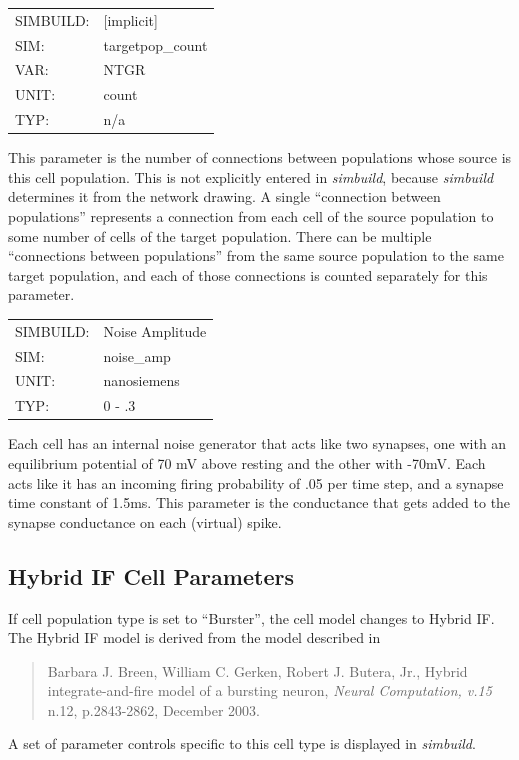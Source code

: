 \documentclass[12pt,openany,oneside]{book}
\newcommand{\ticite}[1]{\textit{#1}}
\newcommand{\prog}[1]{\textit{{#1}}}
\newcommand{\inquotes}[1]{{{``#1''}}}
\begin{document}
\begin{flushleft}
\begin{tabular}{@{}ll@{}}
SIMBUILD: & [implicit]\\
SIM: & targetpop\_count\\
VAR: & NTGR\\
UNIT: & count\\
TYP: & n/a\\
\end{tabular}
\end{flushleft}
\noindent
This parameter is the number of connections between populations whose
source is this cell population. This is not explicitly entered in
\prog{simbuild}, because \prog{simbuild} determines it from the network drawing. A
single \inquotes{connection between populations} represents a connection from
each cell of the source population to some number of cells of the
target population. There can be multiple \inquotes{connections between
populations} from the same source population to the same target
population, and each of those connections is counted separately for
this parameter.
\filbreak
\vspace{\baselineskip}

\begin{flushleft}
\begin{tabular}{@{}ll@{}}
SIMBUILD: & Noise Amplitude\\
SIM: & noise\_amp\\
UNIT: & nanosiemens\\
TYP: & 0 - .3\\
\end{tabular}
\end{flushleft}
\noindent
Each cell has an internal noise generator that acts like two synapses,
one with an equilibrium potential of 70 mV above resting and the other
with -70mV. Each acts like it has an incoming firing probability of
.05 per time step, and a synapse time constant of 1.5ms. This
parameter is the conductance that gets added to the synapse
conductance on each (virtual) spike.
\filbreak
\vspace{\baselineskip}

\subsection{Hybrid IF Cell Parameters}
\label{Hybrid IF Parameters}
If cell population type is set to \inquotes{Burster},
the cell model changes to Hybrid IF. The
Hybrid IF model is derived from the model described in
\begin{quote}
\label{Breen et al} Barbara J. Breen, William C. Gerken, Robert
J. Butera, Jr., Hybrid integrate-and-fire model of a bursting neuron,
\ticite{Neural Computation, v.15} n.12, p.2843-2862, December 2003.
\end{quote}
A set of parameter controls specific to this cell type is displayed
in \prog{simbuild}.
\end{document}
